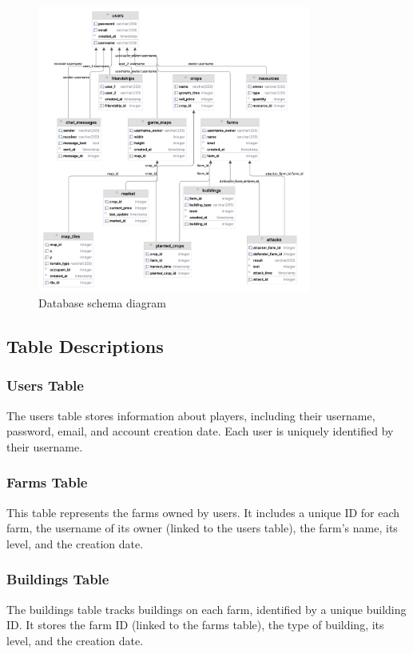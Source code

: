 \documentclass[12pt]{article}
\begin{document}
\begin{figure}[H]
 \centering
 \includegraphics[width=0.8\textwidth]{img/db-diagram.png}
 \caption{Database schema diagram}
\end{figure}


\subsection{Table Descriptions}

\subsubsection{Users Table}
The users table stores information about players, including their username, password, email, and account creation date. Each user is uniquely identified by their username.

\subsubsection{Farms Table}
This table represents the farms owned by users. It includes a unique ID for each farm, the username of its owner (linked to the users table), the farm's name, its level, and the creation date.

\subsubsection{Buildings Table}
The buildings table tracks buildings on each farm, identified by a unique building ID. It stores the farm ID (linked to the farms table), the type of building, its level, and the creation date.
\end{document}
